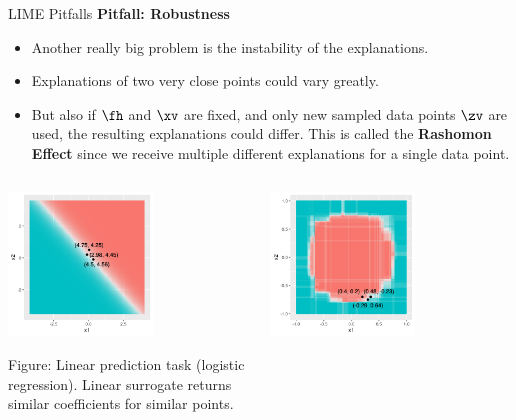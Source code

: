 \documentclass[11pt,compress,t,notes=noshow, xcolor=table]{beamer}
\begin{document}
\begin{vbframe}{LIME Pitfalls}
\textbf{Pitfall: Robustness}
\begin{itemize}
	\item Another really big problem is the instability of the explanations. 
	\item Explanations of two very close points could vary greatly. 
	\item But also if $\fh$ and $\xv$ are fixed, and only new sampled data points $\zv$ are used, the resulting explanations could differ. This is called the \textbf{Rashomon Effect} since we receive multiple different explanations for a single data point. 
\end{itemize}
\vspace{-0.7cm}
\begin{columns}
	\begin{column}{0.48\textwidth}
		\begin{center}
		
		\includegraphics[width=0.6\textwidth]{figure/lime_robustness_1.png}
		
		\tiny{Figure: Linear prediction task (logistic regression). Linear surrogate returns similar coefficients for similar points.}
		
		\end{center}
	\end{column}
	\begin{column}{0.48\textwidth}
		\begin{center}
	\includegraphics[width=0.6\textwidth]{figure/lime_robustness_2.png}
	

\end{center}
\end{column}
\end{columns}
\end{vbframe}
\end{document}
